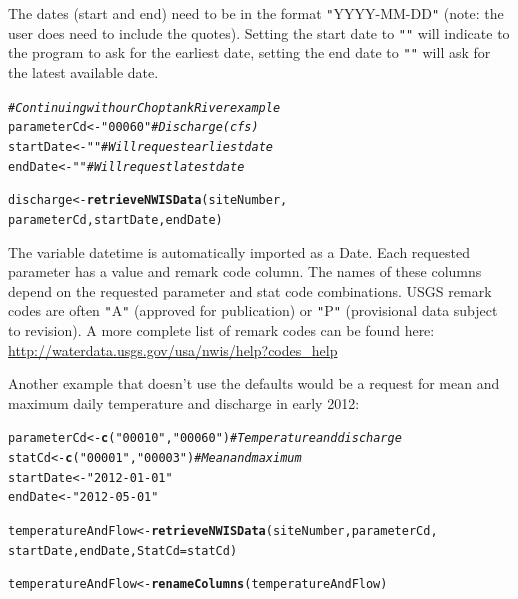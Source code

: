 \documentclass[a4paper,11pt]{article}\usepackage[]{graphicx}\usepackage[]{color}
\makeatletter
\newcommand{\hlstr}[1]{\textcolor[rgb]{0.192,0.494,0.8}{#1}}%
\newcommand{\hlcom}[1]{\textcolor[rgb]{0.678,0.584,0.686}{\textit{#1}}}%
\newcommand{\hlstd}[1]{\textcolor[rgb]{0.345,0.345,0.345}{#1}}%
\newcommand{\hlkwb}[1]{\textcolor[rgb]{0.69,0.353,0.396}{#1}}%
\newcommand{\hlkwc}[1]{\textcolor[rgb]{0.333,0.667,0.333}{#1}}%
\newcommand{\hlkwd}[1]{\textcolor[rgb]{0.737,0.353,0.396}{\textbf{#1}}}%
\newenvironment{kframe}{%
 \def\at@end@of@kframe{}%
 \ifinner\ifhmode%
  \def\at@end@of@kframe{\end{minipage}}%
  \begin{minipage}{\columnwidth}%
 \fi\fi%
 \def\FrameCommand##1{\hskip\@totalleftmargin \hskip-\fboxsep
 \colorbox{shadecolor}{##1}\hskip-\fboxsep
     \hskip-\linewidth \hskip-\@totalleftmargin \hskip\columnwidth}%
 \MakeFramed {\advance\hsize-\width
   \@totalleftmargin\z@ \linewidth\hsize
   \@setminipage}}%
 {\par\unskip\endMakeFramed%
 \at@end@of@kframe}
\newenvironment{knitrout}{}{} %
\makeatother
\begin{document}
The dates (start and end) need to be in the format \texttt{"}YYYY-MM-DD\texttt{"} (note: the user does need to include the quotes).  Setting the start date to \texttt{"}\texttt{"} will indicate to the program to ask for the earliest date, setting the end date to \texttt{"}\texttt{"} will ask for the latest available date.

\begin{knitrout}
\color{fgcolor}\begin{kframe}
\begin{alltt}
\hlcom{# Continuing with our Choptank River example}
\hlstd{parameterCd} \hlkwb{<-} \hlstr{"00060"}  \hlcom{# Discharge (cfs)}
\hlstd{startDate} \hlkwb{<-} \hlstr{""}  \hlcom{# Will request earliest date}
\hlstd{endDate} \hlkwb{<-} \hlstr{""} \hlcom{# Will request latest date}

\hlstd{discharge} \hlkwb{<-} \hlkwd{retrieveNWISData}\hlstd{(siteNumber,}
                    \hlstd{parameterCd, startDate, endDate)}
\end{alltt}
\end{kframe}
\end{knitrout}


The variable datetime is automatically imported as a Date. Each requested parameter has a value and remark code column.  The names of these columns depend on the requested parameter and stat code combinations. USGS remark codes are often \texttt{"}A\texttt{"} (approved for publication) or \texttt{"}P\texttt{"} (provisional data subject to revision). A more complete list of remark codes can be found here:
\url{http://waterdata.usgs.gov/usa/nwis/help?codes_help}

Another example that doesn't use the defaults would be a request for mean and maximum daily temperature and discharge in early 2012:
\begin{knitrout}
\color{fgcolor}\begin{kframe}
\begin{alltt}
\hlstd{parameterCd} \hlkwb{<-} \hlkwd{c}\hlstd{(}\hlstr{"00010"}\hlstd{,}\hlstr{"00060"}\hlstd{)}  \hlcom{# Temperature and discharge}
\hlstd{statCd} \hlkwb{<-} \hlkwd{c}\hlstd{(}\hlstr{"00001"}\hlstd{,}\hlstr{"00003"}\hlstd{)}  \hlcom{# Mean and maximum}
\hlstd{startDate} \hlkwb{<-} \hlstr{"2012-01-01"}
\hlstd{endDate} \hlkwb{<-} \hlstr{"2012-05-01"}

\hlstd{temperatureAndFlow} \hlkwb{<-} \hlkwd{retrieveNWISData}\hlstd{(siteNumber, parameterCd,}
        \hlstd{startDate, endDate,} \hlkwc{StatCd}\hlstd{=statCd)}

\hlstd{temperatureAndFlow} \hlkwb{<-} \hlkwd{renameColumns}\hlstd{(temperatureAndFlow)}
\end{alltt}
\end{kframe}
\end{knitrout}
\end{document}
